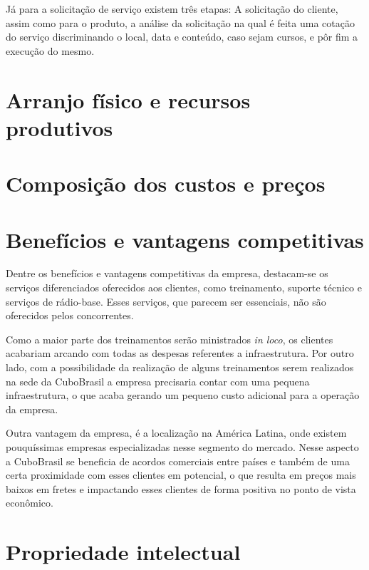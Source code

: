 \documentclass[
	12pt,				%
	openright,			%
	oneside,			%
	a4paper,			%
	english,			%
	french,				%
	spanish,			%
	brazil				%
	]{abntex2}
\begin{document}
	Já para a solicitação de serviço existem três etapas: A solicitação do cliente, assim como para o produto, a análise da solicitação na qual é feita uma cotação do serviço discriminando o local, data e conteúdo, caso sejam cursos, e pôr fim a execução do mesmo.

\section[Arranjo físico e recursos produtivos]{Arranjo físico e recursos produtivos}


\section[Composição dos custos e preços]{Composição dos custos e preços}


\section[Benefícios e vantagens competitivas]{Benefícios e vantagens competitivas}

	Dentre os benefícios e vantagens competitivas da empresa, destacam-se os serviços diferenciados oferecidos aos clientes, como treinamento, suporte técnico e serviços de rádio-base. Esses serviços, que parecem ser essenciais, não são oferecidos pelos concorrentes.
	
	Como a maior parte dos treinamentos serão ministrados \textit{in loco}, os clientes acabariam arcando com todas as despesas referentes a infraestrutura. Por outro lado, com a possibilidade da realização de alguns treinamentos serem realizados na sede da CuboBrasil a empresa precisaria contar com uma pequena infraestrutura, o que acaba gerando um pequeno custo adicional para a operação da empresa.
	
	Outra vantagem da empresa, é a localização na América Latina, onde existem pouquíssimas empresas especializadas nesse segmento do mercado. Nesse aspecto a CuboBrasil se beneficia de acordos comerciais entre países e também de uma certa proximidade com esses clientes em potencial, o que resulta em preços mais baixos em fretes e impactando esses clientes de forma positiva no ponto de vista econômico.

\section[Propriedade intelectual]{Propriedade intelectual}
\end{document}
